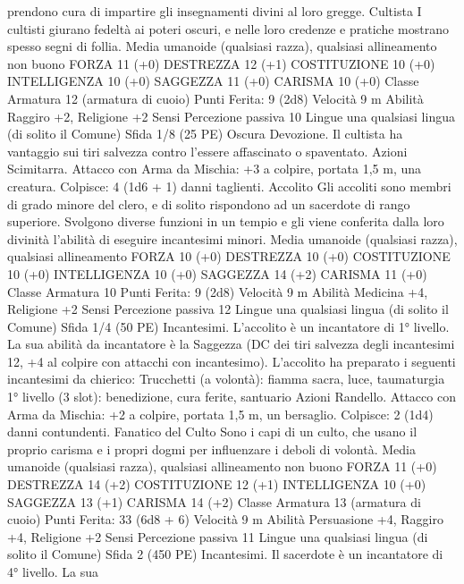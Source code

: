 \begin{multicols}{2}
prendono cura di impartire gli insegnamenti divini al loro
gregge.
Cultista
I cultisti giurano fedeltà ai poteri oscuri, e nelle loro
credenze e pratiche mostrano spesso segni di follia.
Media umanoide (qualsiasi razza), qualsiasi allineamento non
buono
FORZA 11 (+0)
DESTREZZA 12 (+1)
COSTITUZIONE 10 (+0)
INTELLIGENZA 10 (+0)
SAGGEZZA 11 (+0)
CARISMA 10 (+0)
Classe Armatura 12 (armatura di cuoio)
\hspace*{0pt}\hfill{Punti Ferita}: 9 (2d8)
Velocità 9 m
Abilità Raggiro +2, Religione +2
Sensi Percezione passiva 10
Lingue una qualsiasi lingua (di solito il Comune)
Sfida 1/8 (25 PE)
Oscura Devozione. Il cultista ha vantaggio sui tiri salvezza
contro l’essere affascinato o spaventato.
Azioni
Scimitarra. Attacco con Arma da Mischia: +3 a colpire, portata
1,5 m, una creatura.
Colpisce: 4 (1d6 + 1) danni taglienti.
Accolito
Gli accoliti sono membri di grado minore del clero, e di
solito rispondono ad un sacerdote di rango superiore.
Svolgono diverse funzioni in un tempio e gli viene
conferita dalla loro divinità l’abilità di eseguire
incantesimi minori.
Media umanoide (qualsiasi razza), qualsiasi allineamento
FORZA 10 (+0)
DESTREZZA 10 (+0)
COSTITUZIONE 10 (+0)
INTELLIGENZA 10 (+0)
SAGGEZZA 14 (+2)
CARISMA 11 (+0)
Classe Armatura 10
\hspace*{0pt}\hfill{Punti Ferita}: 9 (2d8)
Velocità 9 m
Abilità Medicina +4, Religione +2
Sensi Percezione passiva 12
Lingue una qualsiasi lingua (di solito il Comune)
Sfida 1/4 (50 PE)
Incantesimi. L’accolito è un incantatore di 1° livello. La sua
abilità da incantatore è la Saggezza (DC dei tiri salvezza degli
incantesimi 12, +4 al colpire con attacchi con incantesimo).
L’accolito ha preparato i seguenti incantesimi da chierico:
Trucchetti (a volontà): fiamma sacra, luce, taumaturgia
1° livello (3 slot): benedizione, cura ferite, santuario
Azioni
Randello. Attacco con Arma da Mischia: +2 a colpire, portata
1,5 m, un bersaglio.
Colpisce: 2 (1d4) danni contundenti.
Fanatico del Culto
Sono i capi di un culto, che usano il proprio carisma e i
propri dogmi per influenzare i deboli di volontà.
Media umanoide (qualsiasi razza), qualsiasi allineamento non
buono
FORZA 11 (+0)
DESTREZZA 14 (+2)
COSTITUZIONE 12 (+1)
INTELLIGENZA 10 (+0)
SAGGEZZA 13 (+1)
CARISMA 14 (+2)
Classe Armatura 13 (armatura di cuoio)
\hspace*{0pt}\hfill{Punti Ferita}: 33 (6d8 + 6)
Velocità 9 m
Abilità Persuasione +4, Raggiro +4, Religione +2
Sensi Percezione passiva 11
Lingue una qualsiasi lingua (di solito il Comune)
Sfida 2 (450 PE)
Incantesimi. Il sacerdote è un incantatore di 4° livello. La sua

\end{multicols}
